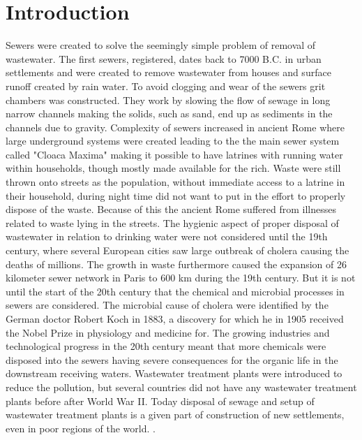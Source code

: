 \chapter{Introduction}
\label{ch:introduction}

Sewers were created to solve the seemingly simple problem of removal of wastewater. The first sewers, registered, dates back to 7000 B.C. in urban settlements and were created to remove wastewater from houses and surface runoff created by rain water. To avoid clogging and wear of the sewers grit chambers was constructed. They work by slowing the flow of sewage in long narrow channels making the solids, such as sand, end up as sediments in the channels due to gravity. Complexity of sewers increased in ancient Rome where large underground systems were created leading to the the main sewer system called "Cloaca Maxima" making it possible to have latrines with running water within households, though mostly made available for the rich.
Waste were still thrown onto streets as the population, without immediate access to a latrine in their household, during night time did not want to put in the effort to properly dispose of the waste. Because of this the ancient Rome suffered from illnesses related to waste lying in the streets. The hygienic aspect of proper disposal of wastewater in relation to drinking water were not considered until the 19th century, where several European cities saw large outbreak of cholera causing the deaths of millions. 
The growth in waste furthermore caused the expansion of 26 kilometer sewer network in Paris to 600 km during the 19th century. But it is not until the start of the 20th century that the chemical and microbial processes in sewers are considered. The microbial cause of cholera were identified by the German doctor Robert Koch in 1883, a discovery for which he in 1905 received the Nobel Prize in physiology and medicine for. The growing industries and technological progress in the 20th century meant that more chemicals were disposed into the sewers having severe consequences for the organic life in the downstream receiving waters. Wastewater treatment plants were introduced to reduce the pollution, but several countries did not have any wastewater treatment plants before after World War II. Today disposal of sewage and setup of wastewater treatment plants is a given part of construction of new settlements, even in poor regions of the world. 
\cite{Sewer_processes}.



